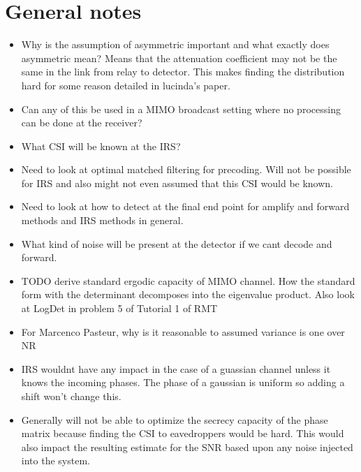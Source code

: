 \documentclass[12pt,a4paper]{report}
\begin{document}
\section{General notes}
\begin{itemize}
\item Why is the assumption of asymmetric important and what exactly does asymmetric mean? Means that the attenuation coefficient may not be the same in the link from relay to detector. This makes finding the distribution hard for some reason detailed in lucinda's paper.
\item Can any of this be used in a MIMO broadcast setting where no processing can be done at the receiver?
\item What CSI will be known at the IRS?
\item Need to look at optimal matched filtering for precoding. Will not be possible for IRS and also might not even assumed that this CSI would be known.
\item Need to look at how to detect at the final end point for amplify and forward methods and IRS methods in general.
\item What kind of noise will be present at the detector if we cant decode and forward. 
\item TODO derive standard ergodic capacity of MIMO channel. How the standard form with the determinant decomposes into the eigenvalue product. Also look at LogDet in problem 5 of Tutorial 1 of RMT
\item For Marcenco Pasteur, why is it reasonable to assumed variance is one over NR
\item IRS wouldnt have any impact in the case of a guassian channel unless it knows the incoming phases. The phase of a gaussian is uniform so adding a shift won't change this. 
\item Generally will not be able to optimize the secrecy capacity of the phase matrix because finding the CSI to eavedroppers would be hard. This would also impact the resulting estimate for the SNR based upon any noise injected into the system.

\end{itemize}
\end{document}
